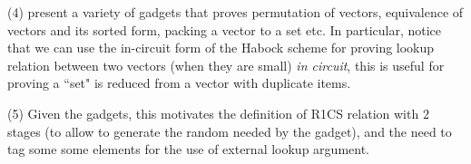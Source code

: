 (4) present a variety of gadgets that proves permutation of vectors, equivalence of vectors and its sorted form, packing a vector to a set etc. In particular, notice that we can use the in-circuit form of the Habock scheme \cite{Hab22} for proving lookup relation between two vectors (when they are small) {\em in circuit}, this is useful for proving a ``set" is reduced from a vector with duplicate items.

(5) Given the gadgets, this motivates the definition of R1CS relation with $2$ stages (to allow to generate the random needed by the gadget), and 
the need to tag some some elements for the use of external lookup argument.
